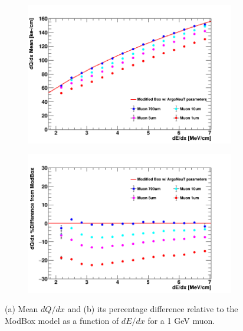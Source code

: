 \begin{figure}[htbp!]
        \begin{subfigure}[b]{0.495\textwidth}   
            \centering 
            \includegraphics[width=\textwidth]{mu_profile}
            \caption{}%
            \label{fig:mu_range_delta_magnitude}
        \end{subfigure}
        \hfill
        \begin{subfigure}[b]{0.495\textwidth}   
            \centering 
            \includegraphics[width=\textwidth]{mu_profile_diff}
            \caption{}%
            \label{fig:mu_range_delta_diff}
        \end{subfigure}
	\caption[Impacts of Delta Ray Fluctuations on Muons]{(a) Mean $dQ/dx$ and (b) its percentage difference relative to the ModBox model as a function of $dE/dx$ for a 1 GeV muon. }
        \label{fig:mu_range_delta}
\end{figure}

